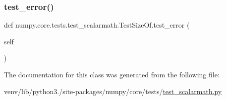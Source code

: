 \mbox{\label{classnumpy_1_1core_1_1tests_1_1test__scalarmath_1_1TestSizeOf_ace7d29e6f123c2d55b359662472cd9ba}} 
\subsubsection{\texorpdfstring{test\+\_\+error()}{test\_error()}}
{\footnotesize\ttfamily def numpy.\+core.\+tests.\+test\+\_\+scalarmath.\+Test\+Size\+Of.\+test\+\_\+error (\begin{DoxyParamCaption}\item[{}]{self }\end{DoxyParamCaption})}



The documentation for this class was generated from the following file\+:\begin{DoxyCompactItemize}
\item 
venv/lib/python3./site-\/packages/numpy/core/tests/\hyperlink{test__scalarmath_8py}{test\+\_\+scalarmath.\+py}\end{DoxyCompactItemize}
